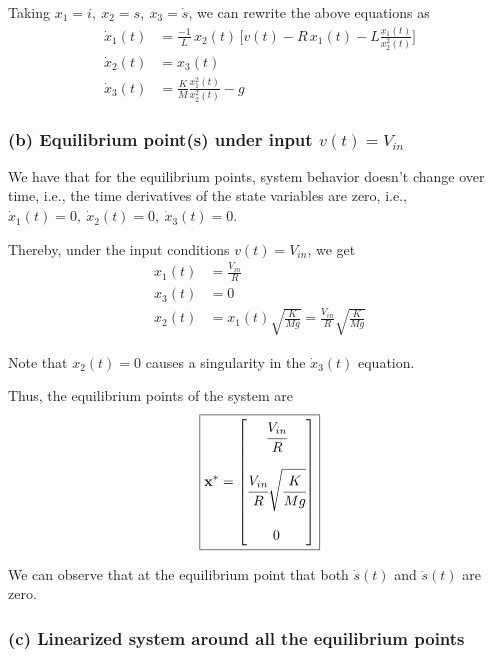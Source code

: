 Taking \( x_1 = i, \ x_2 = s, \ x_3 = \dot s \), we can rewrite the above equations as
\[
    \boxed{
        \begin{aligned}
            \dot x_1(t) & = \frac{-1}{L}\, x_2(t)\, \Big[ v(t) - R\, x_1(t) - L \frac{x_1(t)}{x_2^2(t)} \Big] \\
            \dot x_2(t) & = x_3(t)                                                                            \\
            \dot x_3(t) & = \frac{K}{M} \frac{x_1^2(t)}{x_2^2(t)} - g
        \end{aligned}
    }
\]

\subsubsection*{(b) Equilibrium point(s) under input \(v(t)=V_{in}\)}

We have that for the equilibrium points, system behavior doesn't change over time, i.e., the time derivatives of the state variables are zero, i.e., \( \dot x_1(t) = 0, \ \dot x_2(t) = 0, \ \dot x_3(t) = 0 \).

Thereby, under the input conditions \( v(t)=V_{in} \), we get
\begin{align*}
    x_1(t) & = \frac{V_{in}}{R}                                                  \\
    x_3(t) & = 0                                                                 \\
    x_2(t) & = x_1(t) \sqrt{\frac{K}{Mg}} = \frac{V_{in}}{R} \sqrt{\frac{K}{Mg}}
\end{align*}

Note that \( x_2(t) = 0 \) causes a singularity in the \( \dot x_3(t) \) equation.

Thus, the equilibrium points of the system are
\[
    \boxed{
        \mathbf{x^*} =
        \begin{bmatrix}
            \cfrac{V_{in}}{R}                      \\
            \\
            \cfrac{V_{in}}{R} \sqrt{\cfrac{K}{Mg}} \\
            \\
            0
        \end{bmatrix}
    }
\]

We can observe that at the equilibrium point that both \( \dot s(t) \) and \( \ddot s(t) \) are zero.

\subsubsection*{(c) Linearized system around all the equilibrium points}

